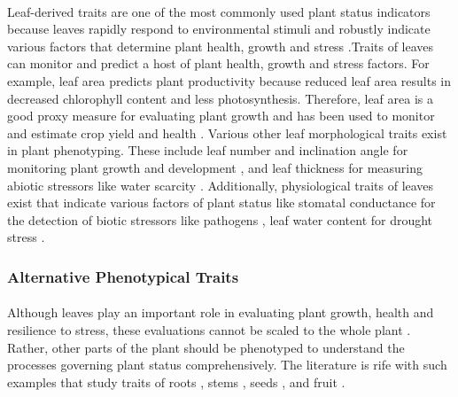 \paragraph{}
Leaf-derived traits are one of the most commonly used plant status indicators because leaves rapidly respond to environmental stimuli and robustly indicate various factors that determine plant health, growth and stress \cite{zhangHighthroughputPhenotypingPlant2023}.Traits of leaves can monitor and predict a host of plant health, growth and stress factors. For example, leaf area predicts plant productivity because reduced leaf area results in decreased chlorophyll content and less photosynthesis. Therefore, leaf area is a good proxy measure for evaluating plant growth and has been used to monitor and estimate crop yield and health \cite{zhangLeafAreaIndex2021}. Various other leaf morphological traits exist in plant phenotyping. These include leaf number and inclination angle for monitoring plant growth and development \cite{praveenkumarRosettePlantSegmentation2020, zhangHighthroughputPhenotypingPlant2023}, and leaf thickness for measuring abiotic stressors like water scarcity \cite{afzalLeafThicknessPredict2017}. Additionally, physiological traits of leaves exist that indicate various factors of plant status like stomatal conductance for the detection of biotic stressors like pathogens \cite{ishimweApplicationsThermalImaging2014}, leaf water content for drought stress \cite{watanabeFundamentalStudyWater2022}. 

\subsubsection{Alternative Phenotypical Traits}
\paragraph{}
Although leaves play an important role in evaluating plant growth, health and resilience to stress, these evaluations cannot be scaled to the whole plant \cite{zhangHighthroughputPhenotypingPlant2023}. Rather, other parts of the plant should be phenotyped to understand the processes governing plant status comprehensively. The literature is rife with such examples that study traits of roots \cite{bodnerHyperspectralImagingNovel2018}, stems \cite{daschoudhuryAutomatedStemAngle2017}, seeds \cite{zhangHighThroughputPhenotypingSeed2018}, and fruit \cite{abebeImageBasedHighThroughputPhenotyping2023}.